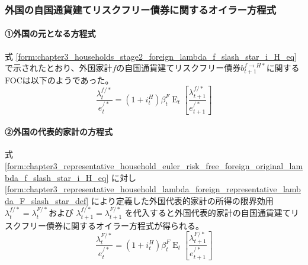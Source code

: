 \subsubsection{外国の自国通貨建てリスクフリー債券に関するオイラー方程式}
\label{sec:chapter3_representative_household_euler_risk_free_foreign}

\paragraph{①外国の元となる方程式}
\label{sec:chapter3_representative_household_euler_risk_free_foreign_original}
式
\eqref{form:chapter3_households_stage2_foreign_lambda_f_slash_star_i_H_eq}
で示されたとおり、外国家計\(f\)の自国通貨建てリスクフリー債券\(b_{t+1}^{f\to H*}\)に関するFOCは以下のようであった。
\begin{equation}
\label{form:chapter3_representative_household_euler_risk_free_foreign_original_lambda_f_slash_star_i_H_eq}
    \frac{\lambda_t^{f/*}}{e_t^{/*}}=(1+i_t^H)\beta_t^F\operatorname{E}_t\left[\frac{\lambda_{t+1}^{f/*}}{e_{t+1}^{/*}}\right]
\end{equation}

\paragraph{②外国の代表的家計の方程式}
\label{sec:chapter3_representative_household_euler_risk_free_foreign_representative}
式
\eqref{form:chapter3_representative_household_euler_risk_free_foreign_original_lambda_f_slash_star_i_H_eq}
に対し
\eqref{form:chapter3_representative_household_lambda_foreign_representative_lambda_F_slash_star_def}
により定義した外国代表的家計の所得の限界効用
\(\lambda_t^{f/*}=\lambda_t^{F/*}\)および
\(\lambda_{t+1}^{f/*}=\lambda_{t+1}^{F/*}\)
を代入すると外国代表的家計の自国通貨建てリスクフリー債券に関するオイラー方程式が得られる。
\begin{equation}
\label{form:chapter3_representative_household_euler_risk_free_foreign_representative_lambda_F_slash_star_i_H_eq}
    \frac{\lambda_t^{F/*}}{e_t^{/*}}=(1+i_t^H)\beta_t^F\operatorname{E}_t\left[\frac{\lambda_{t+1}^{F/*}}{e_{t+1}^{/*}}\right]
\end{equation}